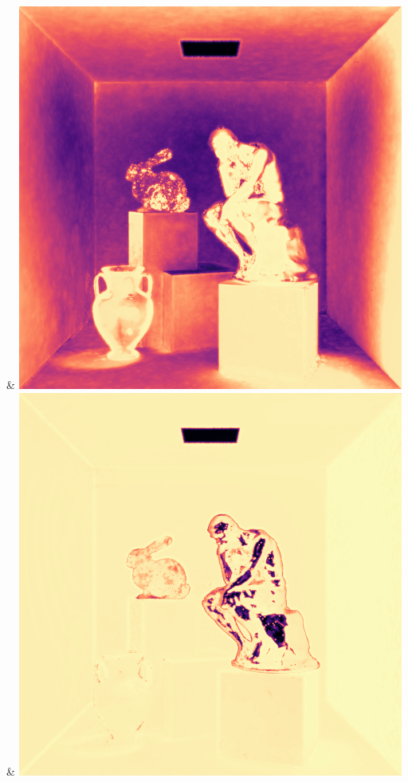 & \includegraphics[width=\linewidth]{figures/py/tests/quality_comparison/nrc+naive_1spp_thinker_flip.png}
& \includegraphics[width=\linewidth]{figures/py/tests/quality_comparison/nrc+naive+bal_1spp_thinker_flip.png}
